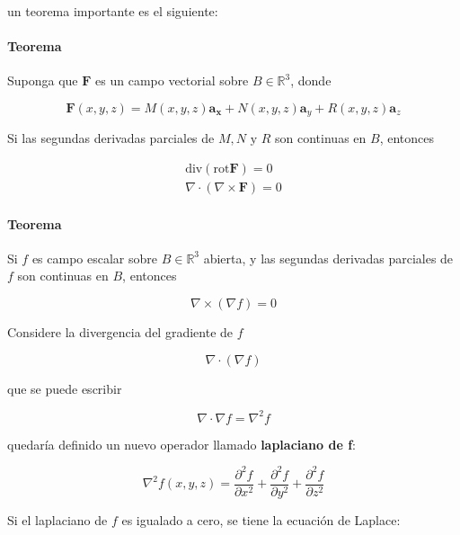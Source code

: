 un teorema importante es el siguiente:

\paragraph*{Teorema} Suponga que $\mathbf{F}$ es un campo vectorial sobre $B \in \mathbb{R}^3$, donde 

\begin{equation*}
\mathbf{F}(x,y,z) = M(x,y,z) \mathbf{a_x} + N(x,y,z) \mathbf{a}_y + R(x,y,z) \mathbf{a}_z
\end{equation*}

Si las segundas derivadas parciales de $M,N \text{ y } R$ son continuas en $B$, entonces

\begin{eqnarray*}
\text{div} (\text{rot} \mathbf{F}) = 0 \\
\nabla \cdot ( \nabla \times \mathbf{F} ) = 0
\end{eqnarray*}

\paragraph*{Teorema} Si $f$ es campo escalar sobre $B \in \mathbb{R}^3$ abierta, y las segundas derivadas parciales de $f$ son continuas en $B$, entonces

\begin{equation*}
\nabla \times ( \nabla f ) = 0
\end{equation*}

Considere la divergencia del gradiente de $f$

\begin{equation*}
\nabla \cdot ( \nabla f )
\end{equation*}

que se puede escribir

\begin{equation*}
\nabla \cdot \nabla f = \nabla^2 f
\end{equation*}

quedaría definido un nuevo operador llamado \textbf{laplaciano de f}:

\begin{equation*}
\nabla^2 f(x,y,z) = \frac{ \partial^2 f }{ \partial x^2 } + \frac{ \partial^2 f }{ \partial y^2 } + \frac{ \partial^2 f }{ \partial z^2 }
\end{equation*}

Si el laplaciano de $f$ es igualado a cero, se tiene la ecuación de Laplace:

